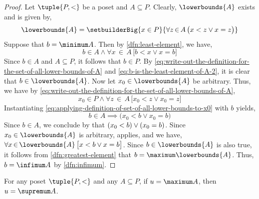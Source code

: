 \begin{proof}
    Let \( \tuple{P, <} \) be a poset and \( A \subseteq P \). Clearly, \( \lowerbounds{A} \) exists and is given by,
    \begin{equation}
        \label{eq:write-out-the-definition-for-the-set-of-all-lower-bounds-of-A}
        \lowerbounds{A} = \setbuilderBig{x \in P}{\forall z\,{\in}\,A \, \big( x < z \lor x = z  \big)}
    \end{equation}
    Suppose that \( b = \minimum A \). Then by \cref{dfn:least-element}, we have,
    \begin{equation}
        \label{eq:b-is-the-least-element-of-A-2}
        b \in A \land \forall x\,{\in}\,A \, \big[ b < x \lor x = b \big]
    \end{equation}
    Since \( b \in A \) and \( A \subseteq P \), it follows that \( b \in P \). By \eqref{eq:write-out-the-definition-for-the-set-of-all-lower-bounds-of-A}
    and \eqref{eq:b-is-the-least-element-of-A-2}, it is clear that \( b \in \lowerbounds{A} \).
    Now let \( x_{0} \in \lowerbounds{A} \) be arbitrary. Thus, we have by \eqref{eq:write-out-the-definition-for-the-set-of-all-lower-bounds-of-A},
    \begin{equation}
        \label{eq:applying-definition-of-set-of-all-lower-bounds-to-x0}
        x_{0} \in P \land \forall z\,{\in}\,A \, \big[ x_{0} < z \lor x_{0} = z \big]
    \end{equation}
    Instantiating \eqref{eq:applying-definition-of-set-of-all-lower-bounds-to-x0} with \( b \) yields,
    \begin{equation*}
        b \in A \implies \big( x_{0} < b \lor x_{0} = b \big)
    \end{equation*}
    Since \( b \in A \), we conclude by  that \( \mleft( x_{0} < b \mright) \lor \mleft( x_{0} = b \mright) \). Since \( x_{0} \in \lowerbounds{A} \)
    is arbitrary,  applies, and we have, \( \forall x\,{\in}\,\lowerbounds{A} \, \big[ x < b \lor x = b \big] \). Since \( b \in \lowerbounds{A} \)
    is also true, it follows from \cref{dfn:greatest-element} that \( b = \maximum \lowerbounds{A} \). Thus, \( b = \infimum A \) by \cref{dfn:infimum}.
\end{proof}

\begin{thm}
    \label{thm:greatest-element-is-the-supremum}
    For any poset \( \tuple{P, <} \) and any \( A \subseteq P \), if \( u = \maximum A \), then \( u = \supremum A \).
\end{thm}

